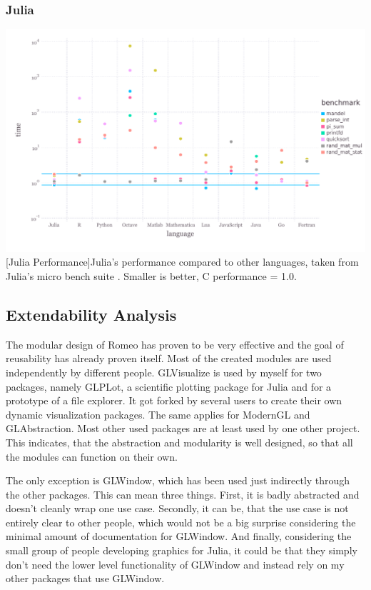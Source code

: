 \subsubsection{Julia}

\vspace{1em}
\begin{minipage}{\linewidth}
    \centering
    \includegraphics[width=0.9\linewidth]{graphics/juliabench.pdf}
    [Julia Performance]{Julia's performance compared to other languages, taken from Julia's micro bench suite \cite{JuliaBench}. Smaller is better, C performance = 1.0.}
    \label{fig:juliabench}
\end{minipage}


\subsection{Extendability Analysis}

The modular design of Romeo has proven to be very effective and the goal of reusability has already proven itself.
Most of the created modules are used independently by different people.
GLVisualize is used by myself for two packages, namely GLPLot, a scientific plotting package for Julia and for a prototype of a file explorer. 
It got forked by several users to create their own dynamic visualization packages.
The same applies for ModernGL and GLAbstraction. Most other used packages are at least used by one other project.
This indicates, that the abstraction and modularity is well designed, so that all the modules can function on their own.

The only exception is GLWindow, which has been used just indirectly through the other packages. 
This can mean three things.
First, it is badly abstracted and doesn't cleanly wrap one use case.
Secondly, it can be, that the use case is not entirely clear to other people, which would not be a big surprise considering the minimal amount of documentation for GLWindow.
And finally, considering the small group of people developing graphics for Julia, it could be that they simply don't need the lower level functionality of GLWindow and instead rely on my other packages that use GLWindow.

